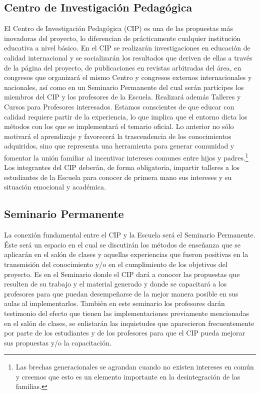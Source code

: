 \documentclass[10pt,letterpaper,oneside]{book}
\begin{document}
\subsection{Centro de Investigación Pedagógica}
El Centro de Investigación Pedagógica (CIP) es una de las propuestas más inovadoras del proyecto, lo diferencian de prácticamente cualquier institución educativa a nivel básico. En el CIP se realizarán investigaciones en educación de calidad internacional y se socializarán los resultados que deriven de ellas a través de la página del proyecto, de publicaciones en revistas arbitradas del área, en congresos que organizará el mismo Centro y congresos externos internacionales y nacionales, así como en un Seminario Permanente del cual serán partícipes los miembros del CIP y los profesores de la Escuela. Realizará además Talleres y Cursos para Profesores interesados. Estamos conscientes de que educar con calidad requiere partir de la experiencia, lo que implica que el entorno dicta los métodos con los que se implementará el temario oficial. Lo anterior no sólo motivará el aprendizaje y favorecerá la trascendencia de los conocimientos adquiridos, sino que representa una herramienta para generar comunidad y fomentar la unión familiar al incentivar intereses comunes entre hijos y padres.\footnote{Las brechas generacionales se agrandan cuando no existen intereses en común y creemos que esto es un elemento importante en la desintegración de las familias.} Los integrantes del CIP deberán, de forma obligatoria, impartir talleres a los estudiantes de la Escuela para conocer de primera mano sus intereses y su situación emocional y académica.
\subsection{Seminario Permanente}
La conexión fundamental entre el CIP y la Escuela será el Seminario Permanente. Éste será un espacio en el cual se discutirán los métodos de enseñanza que se aplicarán en el salón de clases y aquellas experiencias que fueron positivas en la transmisión del conocimiento y/o en el cumplimiento de los objetivos del proyecto. Es en el Seminario donde el CIP dará a conocer las propuestas que resulten de su trabajo y el material generado y donde se capacitará a los profesores para que puedan desempeñarse de la mejor manera posible en sus aulas al implementarlos. También en este seminario los profesores darán testimonio del efecto que tienen las implementaciones previamente mencionadas en el salón de clases, se enlistarán las inquietudes que aparecieron frecuentemente por parte de los estudiantes y de los profesores para que el CIP pueda mejorar sus propuestas y/o la capacitación.
\end{document}

